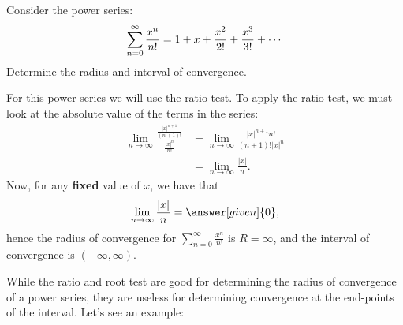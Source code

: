 \documentclass{ximera}
\begin{document}
\begin{example}
  Consider the power series:
  \[
  \sum_{n=0}^\infty \frac{x^n}{n!} = 1 + x + \frac{x^2}{2!} + \frac{x^3}{3!} + \cdots\\
  \]
  Determine the radius and interval of convergence.
  \begin{explanation}
    For this power series we will use the ratio test. To apply the
    ratio test, we must look at the absolute value of the terms in the
    series:
    \begin{align*}
      \lim_{n\to\infty} \frac{\frac{|x|^{n+1}}{(n+1)!}}{\frac{|x|^n}{n!}}
      &= \lim_{n\to\infty} \frac{|x|^{n+1}n!}{(n+1)!|x|^n}\\
      &= \lim_{n\to\infty} \frac{|x|}{n}.
    \end{align*}
    Now, for any \textbf{fixed} value of $x$, we have that
    \[
    \lim_{n\to\infty} \frac{|x|}{n} = \answer[given]{0},
    \]
    hence the radius of convergence for $\sum_{n=0}^\infty
    \frac{x^n}{n!}$ is $R=\infty$, and the interval of convergence is $(-\infty, \infty)$.
  \end{explanation}
\end{example}

While the ratio and root test are good for determining the radius of
convergence of a power series, they are useless for determining
convergence at the end-points of the interval. Let's see an example:
\end{document}
